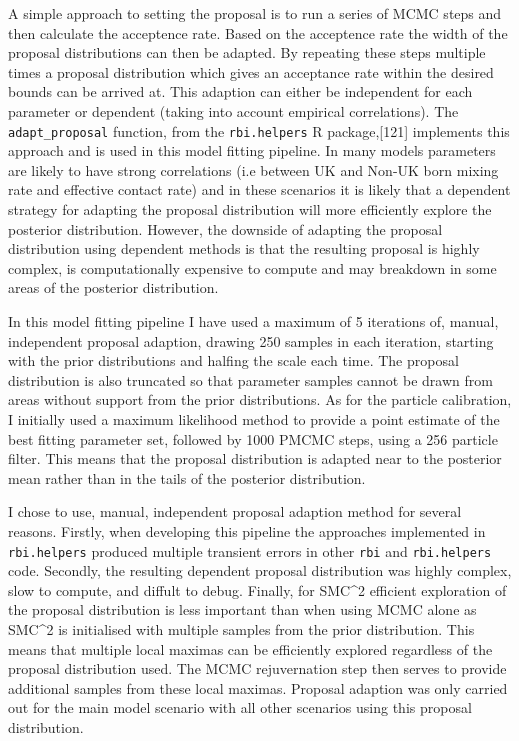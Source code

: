 \documentclass[11pt,twoside]{bristolthesis}
\begin{document}
  A simple approach to setting the proposal is to run a series of MCMC steps and then calculate the acceptence rate. Based on the acceptence rate the width of the proposal distributions can then be adapted. By repeating these steps multiple times a proposal distribution which gives an acceptance rate within the desired bounds can be arrived at. This adaption can either be independent for each parameter or dependent (taking into account empirical correlations). The \texttt{adapt\_proposal} function, from the \texttt{rbi.helpers} R package,{[}121{]} implements this approach and is used in this model fitting pipeline. In many models parameters are likely to have strong correlations (i.e between UK and Non-UK born mixing rate and effective contact rate) and in these scenarios it is likely that a dependent strategy for adapting the proposal distribution will more efficiently explore the posterior distribution. However, the downside of adapting the proposal distribution using dependent methods is that the resulting proposal is highly complex, is computationally expensive to compute and may breakdown in some areas of the posterior distribution.
  
  In this model fitting pipeline I have used a maximum of 5 iterations of, manual, independent proposal adaption, drawing 250 samples in each iteration, starting with the prior distributions and halfing the scale each time. The proposal distribution is also truncated so that parameter samples cannot be drawn from areas without support from the prior distributions. As for the particle calibration, I initially used a maximum likelihood method to provide a point estimate of the best fitting parameter set, followed by 1000 PMCMC steps, using a 256 particle filter. This means that the proposal distribution is adapted near to the posterior mean rather than in the tails of the posterior distribution.
  
  I chose to use, manual, independent proposal adaption method for several reasons. Firstly, when developing this pipeline the approaches implemented in \texttt{rbi.helpers} produced multiple transient errors in other \texttt{rbi} and \texttt{rbi.helpers} code. Secondly, the resulting dependent proposal distribution was highly complex, slow to compute, and diffult to debug. Finally, for SMC\^{}2 efficient exploration of the proposal distribution is less important than when using MCMC alone as SMC\^{}2 is initialised with multiple samples from the prior distribution. This means that multiple local maximas can be efficiently explored regardless of the proposal distribution used. The MCMC rejuvernation step then serves to provide additional samples from these local maximas. Proposal adaption was only carried out for the main model scenario with all other scenarios using this proposal distribution.
  
\end{document}
